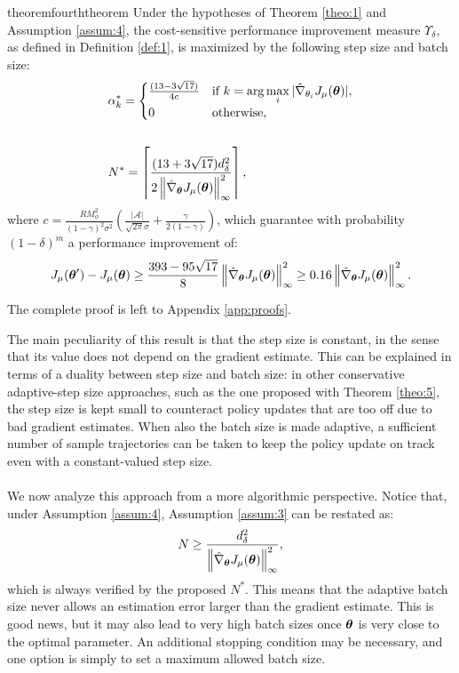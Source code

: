 \begin{restatable}{theorem}{fourththeorem}\label{theo:5}
Under the hypotheses of Theorem \ref{theo:1} and Assumption \ref{assum:4}, the cost-sensitive performance improvement measure $\Upsilon_\delta$, as defined in Definition \ref{def:1}, is maximized by the following step size and batch size: 
\begin{align*}
&\alpha_k^* = 
\begin{cases}  
	\frac{(13-3\sqrt{17})}
		{4c} & 
		\text{if } k = \arg\max\limits_i |\gradApp{\theta_i}|,	\\
		0 & \text{otherwise},
\end{cases}
\\\\
&N^* = \left\lceil\frac{(13+3\sqrt{17})d_{\delta}^2}{2\norm[\infty]{\gradApp{\vtheta}}^2}\right\rceil,
\end{align*}
where $c = \frac{RM_{\phi}^2}{(1-\gamma)^2\sigma^2}\left(\frac{|\mathcal{A}|}{\sqrt{2\pi}\sigma} +	\frac{\gamma}{2(1-\gamma)}\right)$, which guarantee with probability $(1-\delta)^m$ a performance improvement of:
\[
\DeltaJ \geq
\frac{393-95\sqrt{17}}{8}\norm[\infty]{\gradApp{\vtheta}}^2 \geq 0.16 \norm[\infty]{\gradApp{\vtheta}}^2.
\]
\end{restatable}

The complete proof is left to Appendix \ref{app:proofs}.

The main peculiarity of this result is that the step size is constant, in the sense that its value does not depend on the gradient estimate. This can be explained in terms of a duality between step size and batch size: in other conservative adaptive-step size approaches, such as the one proposed with Theorem \ref{theo:5}, the step size is kept small to counteract policy updates that are too off due to bad gradient estimates. When also the batch size is made adaptive, a sufficient number of sample trajectories can be taken to keep the policy update on track even with a constant-valued step size.
\paragraph{}
We now analyze this approach from a more algorithmic perspective.
Notice that, under Assumption \ref{assum:4}, Assumption \ref{assum:3} can be restated as:
\[
	N \geq \frac{d_\delta^2}{\norm[\infty]{\gradApp{\vtheta}}^2},
\]
which is always verified by the proposed $N^*$. This means that the adaptive batch size never allows an estimation error larger than the gradient estimate. This is good news, but it may also lead to very high batch sizes once $\vtheta$ is very close to the optimal parameter. An additional stopping condition may be necessary, and one option is simply to set a maximum allowed batch size.
